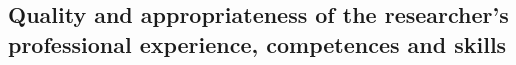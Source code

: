 \subsection{Quality and appropriateness of the researcher’s professional experience, competences and skills}
\label{sec:experience}

